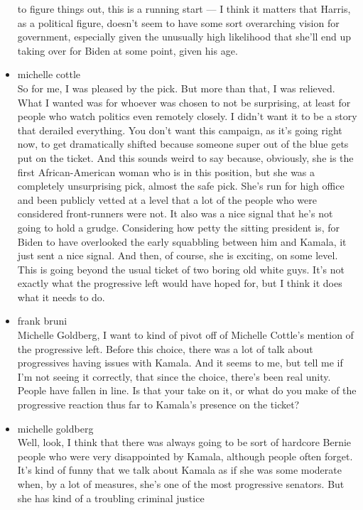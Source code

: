 \begin{itemize}
  to figure things out, this is a running start --- I think it matters
  that Harris, as a political figure, doesn't seem to have some sort
  overarching vision for government, especially given the unusually high
  likelihood that she'll end up taking over for Biden at some point,
  given his age.
\item
  michelle cottle\\
  So for me, I was pleased by the pick. But more than that, I was
  relieved. What I wanted was for whoever was chosen to not be
  surprising, at least for people who watch politics even remotely
  closely. I didn't want it to be a story that derailed everything. You
  don't want this campaign, as it's going right now, to get dramatically
  shifted because someone super out of the blue gets put on the ticket.
  And this sounds weird to say because, obviously, she is the first
  African-American woman who is in this position, but she was a
  completely unsurprising pick, almost the safe pick. She's run for high
  office and been publicly vetted at a level that a lot of the people
  who were considered front-runners were not. It also was a nice signal
  that he's not going to hold a grudge. Considering how petty the
  sitting president is, for Biden to have overlooked the early
  squabbling between him and Kamala, it just sent a nice signal. And
  then, of course, she is exciting, on some level. This is going beyond
  the usual ticket of two boring old white guys. It's not exactly what
  the progressive left would have hoped for, but I think it does what it
  needs to do.
\item
  frank bruni\\
  Michelle Goldberg, I want to kind of pivot off of Michelle Cottle's
  mention of the progressive left. Before this choice, there was a lot
  of talk about progressives having issues with Kamala. And it seems to
  me, but tell me if I'm not seeing it correctly, that since the choice,
  there's been real unity. People have fallen in line. Is that your take
  on it, or what do you make of the progressive reaction thus far to
  Kamala's presence on the ticket?
\item
  michelle goldberg\\
  Well, look, I think that there was always going to be sort of hardcore
  Bernie people who were very disappointed by Kamala, although people
  often forget. It's kind of funny that we talk about Kamala as if she
  was some moderate when, by a lot of measures, she's one of the most
  progressive senators. But she has kind of a troubling criminal justice

\end{itemize}
